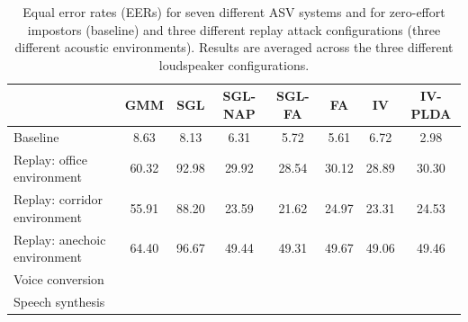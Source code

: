 \begin{table}
\renewcommand{\arraystretch}{1.2}
\begin{center}
    \begin{tabular}{ l  c c c c c c c}
    \hline
 &  GMM & SGL & SGL-NAP  & SGL-FA & FA & IV & IV-PLDA \\ 
 \hline \hline
Baseline & 8.63 & 8.13 & 6.31 & 5.72 & 5.61 & 6.72 & 2.98\\
\hline
Replay: office environment & 60.32 & 92.98 & 29.92 & 28.54 & 30.12 & 28.89 & 30.30\\
Replay: corridor environment & 55.91 & 88.20 & 23.59 & 21.62 & 24.97 & 23.31 & 24.53\\
Replay: anechoic environment & 64.40 & 96.67 & 49.44 & 49.31 & 49.67 & 49.06 & 49.46\\
\hline
Voice conversion &&&&&&&\\
Speech synthesis &&&&&&&\\
\hline
    \end{tabular}
    \caption{Equal error rates (EERs) for seven different ASV systems and for zero-effort impostors (baseline) and three different replay attack configurations (three different acoustic environments).  Results are averaged across the three different loudspeaker configurations.}
		\label{tab::results_EER}
   \end{center}

\end{table}


